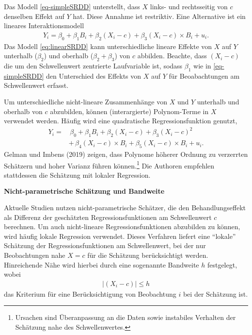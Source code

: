 \documentclass[
  a4paper,
  DIV=11,
  oneside]{scrreprt}
\begin{document}
Das Modell \eqref{eq-simpleSRDD} unterstellt, dass \(X\) links- und
rechtsseitig von \(c\) denselben Effekt auf \(Y\) hat. Diese Annahme ist
restriktiv. Eine Alternative ist ein lineares Interaktionsmodell
\begin{align}
Y_i = \beta_0 + \beta_1 B_i + \beta_2 (X_i - c) + \beta_3(X_i - c)\times B_i + u_i.\label{eq:linearSRDD}
\end{align} Das Modell \eqref{eq:linearSRDD} kann unterschiedliche
lineare Effekte von \(X\) auf \(Y\) unterhalb (\(\beta_2\)) und oberhalb
(\(\beta_2 + \beta_3\)) von \(c\) abbilden. Beachte, dass \((X_i - c)\)
die um den Schwellenwert zentrierte Laufvariable ist, sodass \(\beta_1\)
wie in \eqref{eq-simpleSRDD} den Unterschied des Effekts von \(X\) auf
\(Y\) für Beoabachtungen am Schwellenwert erfasst.

Um unterschiedliche nicht-lineare Zusammenhänge von \(X\) und \(Y\)
unterhalb und oberhalb von \(c\) abzubilden, können (interargierte)
Polynom-Terme in \(X\) verwendet werden. Häufig wird eine quadratische
Regressionsfunktion genutzt, \begin{align}
  Y_i =&\, \beta_0 + \beta_1 B_i + \beta_2 (X_i - c) + \beta_3 (X_i - c)^2\\ 
       &+\, \beta_4(X_i - c)\times B_i + \beta_5(X_i - c)\times B_i + u_i.\label{eq:quadSRDD}
\end{align} Gelman und Imbens (2019) zeigen, dass Polynome höherer
Ordnung zu verzerrten Schätzern und hoher Varianz führen
können.\footnote{Ursachen sind Überanpassung an die Daten sowie
  instabiles Verhalten der Schätzung nahe des Schwellenwertes.} Die
Authoren empfehlen stattdessen die Schätzung mit lokaler Regression.

\textbf{Nicht-parametrische Schätzung und Bandweite}

Aktuelle Studien nutzen nicht-parametrische Schätzer, die den
Behandlungseffekt als Differenz der geschätzten Regressionsfunktionen am
Schwellenwert \(c\) berechnen. Um auch nicht-lineare
Regressionsfunktionen abzubilden zu können, wird häufig lokale
Regression verwendet. Dieses Verfahren liefert eine ``lokale'' Schätzung
der Regressionsfunktionen am Schwellenwert, bei der nur Beobachtungen
nahe \(X = c\) für die Schätzung berücksichtigt werden. Hinreichende
Nähe wird hierbei durch eine sogenannte Bandweite \(h\) festgelegt,
wobei \begin{align}
  \lvert(X_i-c)\rvert\leq h \label{eq:bwc}
\end{align} das Kriterium für eine Berücksichtigung von Beobachtung
\(i\) bei der Schätzung ist.
\end{document}
